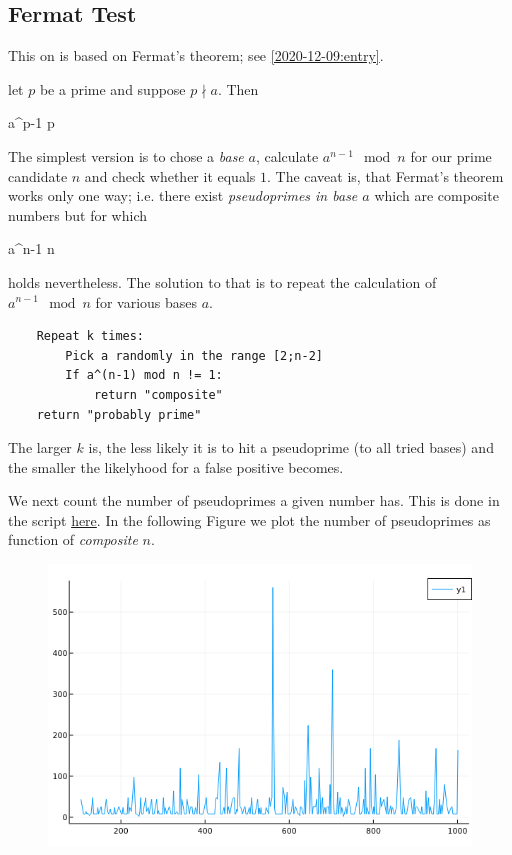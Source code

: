 
\subsection{Fermat Test}

This on is based on Fermat's theorem; see \ref{2020-12-09:entry}.

\begin{theorem}
    let $p$ be a prime and suppose $p \nmid a$. Then

    \bee
        a^{p-1}  \mod p
    \eee
\end{theorem}

The simplest version is to chose a \emph{base} $a$, calculate $a^{n-1} \mod n$ for our prime candidate $n$ and check whether it equals $1$. The caveat is, that Fermat's theorem works only one way; i.e. there exist \emph{pseudoprimes in base $a$} which are composite numbers but for which 

\bee
    a^{n-1}  \mod n
\eee

holds nevertheless. The solution to that is to repeat the calculation of $a^{n-1} \mod n$ for various bases $a$.

\begin{verbatim}
    Repeat k times:
        Pick a randomly in the range [2;n-2]
        If a^(n-1) mod n != 1:
            return "composite"
    return "probably prime"
\end{verbatim}

The larger $k$ is, the less likely it is to hit a pseudoprime (to all tried bases) and the smaller the likelyhood for a false positive becomes.

We next count the number of pseudoprimes a given number has. This is done in the script \href{https://github.com/ClemensFMN/JuliaStuff/blob/master/NumberTheory/pseudo_primes.jl}{here}. In the following Figure we plot the number of pseudoprimes as function of \emph{composite} $n$.

\begin{figure}[H]
    \centering
    \includegraphics[scale=0.6]{images/2021-04-06-pseudo_primes_1.png}
\end{figure}


